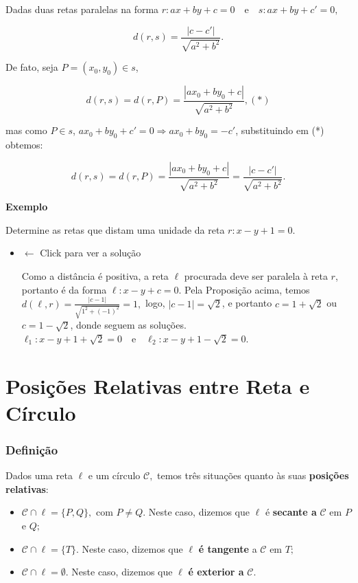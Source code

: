 \documentclass[
  brazilian,
  letterpaper,
  DIV=11,
  numbers=noendperiod]{scrreprt}
\providecommand{\tightlist}{%
  \setlength{\itemsep}{0pt}\setlength{\parskip}{0pt}}
\theoremstyle{definition}
\theoremstyle{plain}
\theoremstyle{definition}
\theoremstyle{remark}
\begin{document}
Dadas duas retas paralelas na forma
\(r: ax+by+c=0 \quad \text{e} \quad s: ax+by+c'=0,\)

\[
d(r,s)=\frac{|c-c'|}{\sqrt{a^2+b^2}}.
\]

De fato, seja \(P=(x_0,y_0)  \in s\),

\[
 d(r,s)=d(r,P)=\frac{|ax_0+by_0+c|}{\sqrt{a^2+b^2}},(*)
\]

mas como \(P  \in s\), \(ax_0+by_0+c'=0 \Rightarrow ax_0+by_0=-c'\),
substituindo em (*) obtemos:

\[
 d(r,s)=d(r,P)=\frac{|ax_0+by_0+c|}{\sqrt{a^2+b^2}}=\frac{|c-c'|}{\sqrt{a^2+b^2}}.
\]

\textbf{Exemplo}

Determine as retas que distam uma unidade da reta \(r: x-y+1=0.\)

\begin{itemize}
\item
  \(\leftarrow\) Click para ver a solução

  Como a distância é positiva, a reta \(\ell\) procurada deve ser
  paralela à reta \(r\), portanto é da forma \(\ell: x-y+c=0\). Pela
  Proposição acima, temos
  \(d(\ell,r)=\frac{|c-1|}{\sqrt{1^2+(-1)^2}}=1,\) logo,
  \(|c-1|=\sqrt{2}\), e portanto \(c=1+\sqrt{2}\) ou \(c=1-\sqrt{2}\),
  donde seguem as soluções.
  \(\ell_1: x-y+1+\sqrt{2}=0 \quad \text{e} \quad \ell_2: x-y+1-\sqrt{2}=0.\)
\end{itemize}


\chapter{Posições Relativas entre Reta e
Círculo}\label{posiuxe7uxf5es-relativas-entre-reta-e-cuxedrculo}

\subsection{Definição}\label{definiuxe7uxe3o-13}

Dados uma reta \(\ell\) e um círculo \(\mathcal{C},\) temos três
situações quanto às suas \textbf{posições relativas}:

\begin{itemize}
\tightlist
\item
  \(\mathcal{C} \cap \ell = \{ P,Q\},\) com \(P\ne Q.\) Neste caso,
  dizemos que \(\ell\) é \textbf{secante a} \(\mathcal{C}\) em \(P\) e
  \(Q;\)
\item
  \(\mathcal{C}\cap \ell = \{T\}.\) Neste caso, dizemos que \(\ell\)
  \textbf{é tangente} a \(\mathcal{C}\) em \(T;\)
\item
  \(\mathcal{C} \cap \ell = \emptyset.\) Neste caso, dizemos que
  \(\ell\) \textbf{é exterior a} \(\mathcal{C}.\)
\end{itemize}
\end{document}
